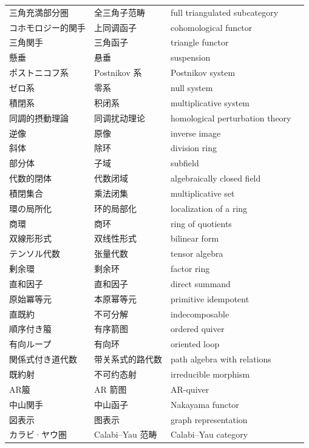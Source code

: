 \begin{longtable}{p{}p{}p{}p{}}
三角充満部分圏 & 全三角子范畴 & full triangulated subcategory &  \\
コホモロジー的関手 & 上同调函子 & cohomological functor &  \\
三角関手 & 三角函子 & triangle functor &  \\
懸垂 & 悬垂 & suspension &  \\
ポストニコフ系 & Postnikov 系 & Postnikov system &  \\
ゼロ系 & 零系 & null system &  \\
積閉系 & 积闭系 & multiplicative system &  \\
同調的摂動理論 & 同调扰动理论 & homological perturbation theory &  \\
逆像 & 原像 & inverse image &  \\
斜体 & 除环 & division ring &  \\
部分体 & 子域 & subfield &  \\
代数的閉体 & 代数闭域 & algebraically closed field &  \\
積閉集合 & 乘法闭集 & multiplicative set &  \\
環の局所化 & 环的局部化 & localization of a ring &  \\
商環 & 商环 & ring of quotients &  \\
双線形形式 & 双线性形式 & bilinear form &  \\
テンソル代数 & 张量代数 & tensor algebra &  \\
剰余環 & 剩余环 & factor ring &  \\
直和因子 & 直和因子 & direct summand &  \\
原始冪等元 & 本原幂等元 & primitive idempotent &  \\
直既約 & 不可分解 & indecomposable &  \\
順序付き箙 & 有序箭图 & ordered quiver &  \\
有向ループ & 有向环 & oriented loop &  \\
関係式付き道代数 & 带关系式的路代数 & path algebra with relations &  \\
既約射 & 不可约态射 & irreducible morphism &  \\
AR箙 & AR 箭图 & AR-quiver &  \\
中山関手 & 中山函子 & Nakayama functor &  \\
図表示 & 图表示 & graph representation &  \\
カラビ·ヤウ圏 & Calabi–Yau 范畴 & Calabi–Yau category &  \\
\end{longtable}
\endgroup
